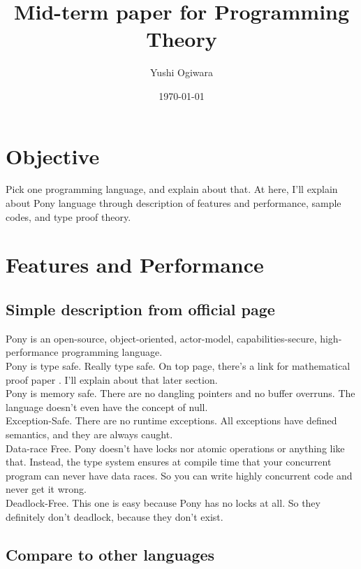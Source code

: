 \documentclass{article}
\title{Mid-term paper for Programming Theory}
\author{Yushi Ogiwara}
\date{\today}
\begin{document}
\maketitle

\section{Objective}
Pick one programming language, and explain about that.
At here, I'll explain about Pony language \cite{ponylang} through description of features and performance, sample codes, and type proof theory.


\section{Features and Performance}
\subsection{Simple description from official page \cite{ponylang}}
Pony is an open-source, object-oriented, actor-model, capabilities-secure, high-performance programming language. \\

Pony is type safe. Really type safe. On top page, there’s a link for mathematical proof paper \cite{type-proof-paper}. I’ll explain about that later section. \\

Pony is memory safe. There are no dangling pointers and no buffer overruns. The language doesn't even have the concept of null. \\

Exception-Safe. There are no runtime exceptions. All exceptions have defined semantics, and they are always caught. \\

Data-race Free. Pony doesn’t have locks nor atomic operations or anything like that. Instead, the type system ensures at compile time that your concurrent program can never have data races. So you can write highly concurrent code and never get it wrong. \\

Deadlock-Free. This one is easy because Pony has no locks at all. So they definitely don’t deadlock, because they don’t exist.

\subsection{Compare to other languages}
\end{document}

